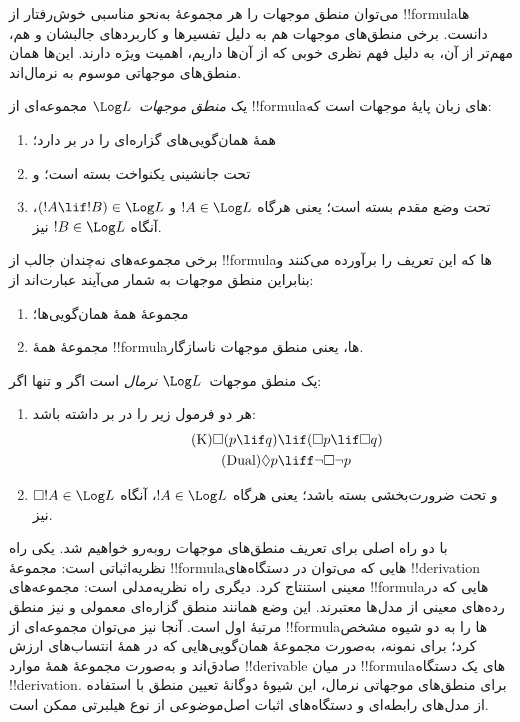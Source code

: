 \documentclass[../../../include/open-logic-section]{subfiles}
\begin{document}


می‌توان منطق موجهات را هر مجموعهٔ به‌نحو مناسبی خوش‌رفتار از
!!{formula}ها دانست. برخی منطق‌های موجهات هم به دلیل تفسیرها و
کاربردهای جالبشان و هم، مهم‌تر از آن، به دلیل فهم نظری خوبی که از
آن‌ها داریم، اهمیت ویژه دارند. این‌ها همان منطق‌های موجهاتی موسوم به
نرمال‌اند.

\begin{defn}
یک \emph{منطق موجهات}~$\Log L$ مجموعه‌ای از !!{formula}های زبان پایهٔ
موجهات است که:
\begin{enumerate}
\item همهٔ همان‌گویی‌های گزاره‌ای را در بر دارد؛
\item تحت جانشینی یکنواخت بسته است؛ و
\item تحت وضع مقدم بسته است؛ یعنی هرگاه $!A \in \Log L$ و
  $(!A \lif !B) \in \Log L$، آنگاه $!B \in \Log L$ نیز.
\end{enumerate}
\end{defn}

\begin{ex}
برخی مجموعه‌های نه‌چندان جالب از !!{formula}ها که این تعریف را برآورده
می‌کنند و بنابراین منطق موجهات به شمار می‌آیند عبارت‌اند از:
\begin{enumerate}
\item مجموعهٔ همهٔ همان‌گویی‌ها؛
\item مجموعهٔ همهٔ !!{formula}ها، یعنی منطق موجهات ناسازگار.
\end{enumerate}
\end{ex}

\begin{defn}
یک منطق موجهات~$\Log L$ \emph{نرمال} است اگر و تنها اگر:
\begin{enumerate}
\item هر دو فرمول زیر را در بر داشته باشد:
\begin{align}
\tag{K} \Box(p \lif q) & \lif (\Box p \lif \Box q) \\
\tag{Dual} \Diamond p & \liff \lnot \Box \lnot p
\end{align}
\item و تحت ضرورت‌بخشی بسته باشد؛ یعنی هرگاه $!A \in \Log L$، آنگاه
  $\Box !A \in \Log L$ نیز.
\end{enumerate}
\end{defn}

با دو راه اصلی برای تعریف منطق‌های موجهات روبه‌رو خواهیم شد. یکی راه
نظریه‌اثباتی است: مجموعهٔ !!{formula}هایی که می‌توان در دستگاه‌های
!!{derivation} معینی استنتاج کرد. دیگری راه نظریه‌مدلی است: مجموعه‌های
!!{formula}هایی که در رده‌های معینی از مدل‌ها معتبرند. این وضع همانند
منطق گزاره‌ای معمولی و نیز منطق مرتبهٔ اول است. آنجا نیز می‌توان
مجموعه‌ای از !!{formula}ها را به دو شیوه مشخص کرد؛ برای نمونه، به‌صورت
مجموعهٔ همان‌گویی‌هایی که در همهٔ انتساب‌های ارزش صادق‌اند و به‌صورت
مجموعهٔ همهٔ موارد !!{derivable} در میان !!{formula}های یک دستگاه
!!{derivation}. برای منطق‌های موجهاتی نرمال، این شیوهٔ دوگانهٔ تعیین
منطق با استفاده از مدل‌های رابطه‌ای و دستگاه‌های اثبات اصل‌موضوعی از
نوع هیلبرتی ممکن است.
\end{document}
